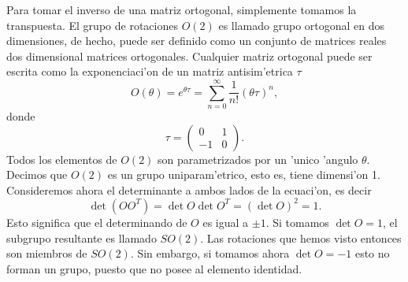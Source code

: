 Para tomar el inverso de una matriz ortogonal, simplemente tomamos la transpuesta. El grupo de rotaciones $O(2)$ es llamado grupo ortogonal en dos dimensiones, de hecho, puede ser definido como un conjunto de matrices reales dos dimensional matrices ortogonales. Cualquier matriz ortogonal puede ser escrita como la exponenciaci'on de un matriz antisim'etrica $\tau$
\begin{equation}
O(\theta)=e^{\theta\tau}=\sum_{n=0}^\infty \frac{1}{n!}(\theta\tau)^n,
\end{equation}
donde
\begin{equation}
\tau=\begin{pmatrix}0 & 1\\
-1 & 0
\end{pmatrix}.
\end{equation}
Todos los elementos de $O(2)$ son parametrizados por un 'unico 'angulo $\theta$. Decimos que $O(2)$ es un grupo uniparam'etrico, esto es, tiene dimensi'on 1. 
Consideremos ahora el determinante a ambos lados de la ecuaci'on, es decir
\begin{equation}
\det (OO^T)=\det O \det O^T =(\det O)^2=1.
\end{equation}
Esto significa que el determinando de $O$ es igual a $\pm 1$. Si tomamos $\det O=1$, el subgrupo resultante es llamado $SO(2)$. Las rotaciones que hemos visto entonces son miembros de $SO(2)$. Sin embargo, si tomamos ahora $\det O=-1$ esto no forman un grupo, puesto que no posee al elemento identidad.


